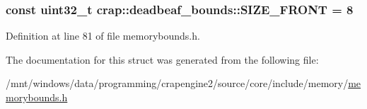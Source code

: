 \subsubsection[{S\+I\+Z\+E\+\_\+\+F\+R\+O\+N\+T}]{\setlength{\rightskip}{0pt plus 5cm}const uint32\+\_\+t crap\+::deadbeaf\+\_\+bounds\+::\+S\+I\+Z\+E\+\_\+\+F\+R\+O\+N\+T = 8\hspace{0.3cm}{\ttfamily [static]}}\label{structcrap_1_1deadbeaf__bounds_af8de969a7504a7bc2bc13f8fc478b764}


Definition at line 81 of file memorybounds.\+h.



The documentation for this struct was generated from the following file\+:\begin{DoxyCompactItemize}
\item 
/mnt/windows/data/programming/crapengine2/source/core/include/memory/\hyperlink{memorybounds_8h}{memorybounds.\+h}\end{DoxyCompactItemize}
